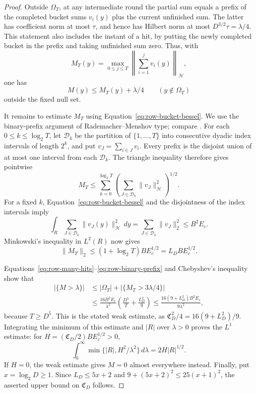 \begin{proof}
Outside $\Omega_T$, at any intermediate round the partial sum
equals a prefix of the completed bucket sums $v_i(y)$ plus the
current unfinished sum.  The latter has coefficient norm at most
$\tau$, and hence has Hilbert norm at most
$D^{3/2}\tau=\lambda/4$.  This statement also includes the instant
of a hit, by putting the newly completed bucket in the prefix and
taking unfinished sum zero.  Thus, with
\[
 M_T(y)=\max_{0\le j\le T}\left\|\sum_{i=1}^jv_i(y)\right\|_{\mathcal H},
\]
one has
\begin{equation}
 M(y)\le M_T(y)+\lambda/4\qquad(y\notin\Omega_T)
 \label{eq:row-prefix-domination}
\end{equation}
outside the fixed null set.

It remains to estimate $M_T$ using
Equation~\eqref{eq:row-bucket-bessel}.  We use the binary-prefix argument
of Rademacher--Menshov type; compare \cite[Lemma~2.7]{KrauseLacey2020}.
For each
$0\le k\le\log_2T$, let $\mathcal D_k$ be the partition of
$\{1,\ldots,T\}$ into consecutive dyadic index intervals of length
$2^k$, and put $v_J=\sum_{i\in J}v_i$.  Every prefix is the disjoint
union of at most one interval from each $\mathcal D_k$.  The triangle
inequality therefore gives pointwise
\[
 M_T\le
 \sum_{k=0}^{\log_2T}
       \left(\sum_{J\in\mathcal D_k}\|v_J\|_{\mathcal H}^2\right)^{1/2}.
\]
For a fixed $k$, Equation~\eqref{eq:row-bucket-bessel} and the
disjointness of the index intervals imply
\[
 \int_R\sum_{J\in\mathcal D_k}\|v_J(y)\|_{\mathcal H}^2\,dy
 =\sum_{J\in\mathcal D_k}\|v_J\|_2^2
 \le B^2E_c.
\]
Minkowski's inequality in $L^2(R)$ now gives
\begin{equation}
 \|M_T\|_2\le (1+\log_2T)B E_c^{1/2}=L_D B E_c^{1/2}.
 \label{eq:row-binary-prefix}
\end{equation}

Equations~\eqref{eq:row-many-hits}--\eqref{eq:row-binary-prefix}
and Chebyshev's inequality show that
\[
 \begin{split}
 |\{M>\lambda\}|
 &\le |\Omega_T|+|\{M_T>3\lambda/4\}|\\
 &\le \frac{16B^2E_c}{\lambda^2}
             \left(\frac{D^5}{T}+\frac{L_D^2}{9}\right)
 \le \frac{16(9+L_D^2)B^2E_c}{9\lambda^2},
 \end{split}
\]
because $T\ge D^5$.  This is the stated weak estimate, as
$\mathfrak C_D^2/4=16(9+L_D^2)/9$.  Integrating the minimum of
this estimate and $|R|$ over $\lambda>0$ proves the $L^1$ estimate:
for $H=(\mathfrak C_D/2)BE_c^{1/2}>0$,
\[
 \int_0^\infty\min\{|R|,H^2/\lambda^2\}\,d\lambda
 =2H|R|^{1/2}.
\]
If $H=0$, the weak estimate gives $M=0$ almost everywhere instead.
Finally, put $x=\log_2D\ge1$.  Since $L_D\le5x+2$ and
$9+(5x+2)^2\le25(x+1)^2$, the asserted upper bound on
$\mathfrak C_D$ follows.
\end{proof}

